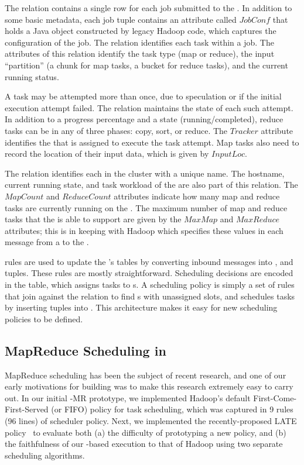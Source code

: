 The  relation contains a single row for each job submitted to the
{\JT}. In addition to some basic metadata, each job tuple contains an attribute
called $JobConf$ that holds a Java object constructed by legacy Hadoop
code, which captures the configuration of the job. The  relation
identifies each task within a job. The attributes of this relation identify the
task type (map or reduce), the input ``partition'' (a chunk for map tasks, a
bucket for reduce tasks), and the current running status.

A task may be attempted more than once, due to speculation or if the initial
execution attempt failed.  The  relation maintains the state
of each such attempt.  In addition to a progress percentage and a state
(running/completed), reduce tasks can be in any of three phases: copy, sort, or
reduce. The $Tracker$ attribute identifies the {\TT} that is assigned to
execute the task attempt. Map tasks also need to record the location of their
input data, which is given by $InputLoc$. 

The  relation identifies each {\TT} in the cluster with a
unique name.  The hostname, current running state, and task workload of the \TT
are also part of this relation.  The $MapCount$ and $ReduceCount$ attributes
indicate how many map and reduce tasks are currently running on the \TT.  The
maximum number of map and reduce tasks that the \TT is able to support are
given by the $MaxMap$ and $MaxReduce$ attributes; this is in keeping with
Hadoop which specifies these values in each message from a \TT to the \JT.

\OVERLOG rules are used to update the {\JT}'s tables by converting inbound messages
into ,  and  tuples. These rules
are mostly straightforward. Scheduling decisions are encoded in the
 table, which assigns tasks to {\TT}s. A scheduling policy is
simply a set of rules that join against the  relation to find
\TT{}s with unassigned slots, and schedules tasks by inserting tuples into
. This architecture makes it easy for new scheduling policies
to be defined.

\subsection{MapReduce Scheduling in \OVERLOG}
\label{ch:boom:sec:scheduler}

MapReduce scheduling has been the subject of recent research, and one of our
early motivations for building \BOOMA was to make this research extremely easy
to carry out.  In our initial \BOOM-MR prototype, we implemented Hadoop's
default First-Come-First-Served (or FIFO) policy for task scheduling, which was
captured in 9 rules (96 lines) of scheduler policy.  Next, we implemented the
recently-proposed LATE policy~\cite{zaharia-late} to evaluate both (a) the
difficulty of prototyping a new policy, and (b) the faithfulness of our
\OVERLOG-based execution to that of Hadoop using two separate scheduling
algorithms.

